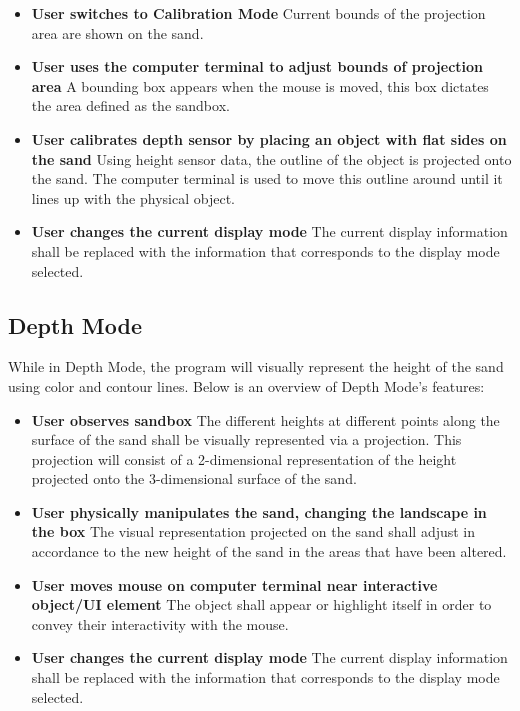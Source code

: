 \documentclass[onecolumn, draftclsnofoot,10pt, compsoc]{IEEEtran}
\begin{document}
\begin{itemize}
\item \textbf{User switches to Calibration Mode}
Current bounds of the projection area are shown on the sand.

\item \textbf{User uses the computer terminal to adjust bounds of projection area}
A bounding box appears when the mouse is moved, this box dictates the area defined as the sandbox.

\item \textbf{User calibrates depth sensor by placing an object with flat sides on the sand}
Using height sensor data, the outline of the object is projected onto the sand. 
The computer terminal is used to move this outline around until it lines up with the physical object.

\item \textbf{User changes the current display mode}
The current display information shall be replaced with the information that corresponds to the display mode selected.
\end{itemize}

\subsection{Depth Mode}
While in Depth Mode, the program will visually represent the height of the sand using color and contour lines. Below is an overview of Depth Mode's features:

\begin{itemize}
\item \textbf{User observes sandbox}
The different heights at different points along the surface of the sand shall be visually represented via a projection.  This projection will consist of a 2-dimensional representation of the height projected onto the 3-dimensional surface of the sand.

\item \textbf{User physically manipulates the sand, changing the landscape in the box}
The visual representation projected on the sand shall adjust in accordance to the new height of the sand in the areas that have been altered. 

\item \textbf{User moves mouse on computer terminal near interactive object/UI element}
The object shall appear or highlight itself in order to convey their interactivity with the mouse.

\item \textbf{User changes the current display mode}
The current display information shall be replaced with the information that corresponds to the display mode selected.
\end{itemize}
\end{document}
